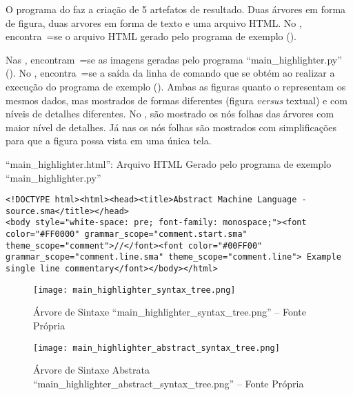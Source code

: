 O programa do  faz a criação de 5 artefatos de resultado.
Duas árvores em forma de figura,
duas arvores em forma de texto e
uma arquivo HTML.
No ,
encontra~=se o arquivo HTML gerado pelo programa de exemplo ().

Nas ,
encontram~=se as imagens geradas pelo programa ``main\_highlighter.py'' ().
No ,
encontra~=se a saída da linha de comando que se obtém ao realizar a execução do programa de exemplo ().
Ambas as figuras  quanto o  representam os mesmos dados,
mas mostrados de formas diferentes (figura \textit{versus} textual) e
com níveis de detalhes diferentes.
No ,
são mostrado os nós folhas das árvores com maior nível de detalhes.
Já nas  os nós folhas são mostrados com simplificações para que a figura possa vista em uma única tela.
\begin{code}
\caption{``main\_highlighter.html'': Arquivo HTML Gerado pelo programa de exemplo ``main\_highlighter.py''}
\label{MainHighlighterHtml}
\begin{verbatim}
<!DOCTYPE html><html><head><title>Abstract Machine Language - source.sma</title></head>
<body style="white-space: pre; font-family: monospace;"><font color="#FF0000" grammar_scope="comment.start.sma" theme_scope="comment">//</font><font color="#00FF00" grammar_scope="comment.line.sma" theme_scope="comment.line"> Example single line commentary</font></body></html>
\end{verbatim}
\end{code}

\begin{figure}[h]
\centering
\texttt{[image: main\_highlighter\_syntax\_tree.png]}
\caption[Árvore de Sintaxe ``main\_highlighter\_syntax\_tree.png'']
{Árvore de Sintaxe ``main\_highlighter\_syntax\_tree.png'' -- Fonte Própria}
\label{MainHighlighterSyntaxTree}
\end{figure}

\begin{figure}[h]
\centering
\texttt{[image: main\_highlighter\_abstract\_syntax\_tree.png]}
\caption[Árvore de Sintaxe Abstrata ``main\_highlighter\_abstract\_syntax\_tree.png'']
{Árvore de Sintaxe Abstrata ``main\_highlighter\_abstract\_syntax\_tree.png'' -- Fonte Própria}
\label{MainHighlighterAbstractSyntaxTree}
\end{figure}


